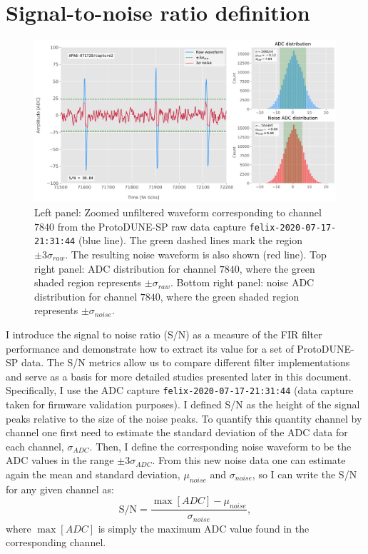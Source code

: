 \section{Signal-to-noise ratio definition}
\label{sec:matched_filter_sn_definition}

\begin{figure}[t]
	\centering
	\includegraphics[width=1\linewidth]{Images/Matched_Filter/waveform_example_raw}
	\caption[Example unfiltered waveform from a ProtoDUNE-SP raw data capture.]{Left panel: Zoomed unfiltered waveform corresponding to channel $7840$ from the ProtoDUNE-SP raw data capture \texttt{felix-2020-07-17-21:31:44} (blue line). The green dashed lines mark the region $\pm3\sigma_{raw}$. The resulting noise waveform is also shown (red line). Top right panel: ADC distribution for channel $7840$, where the green shaded region represents $\pm \sigma_{raw}$. Bottom right panel: noise ADC distribution for channel $7840$, where the green shaded region represents $\pm \sigma_{noise}$.}
	\label{fig:adcs_nofir}
\end{figure}

I introduce the signal to noise ratio (S/N) as a measure of the FIR filter performance and demonstrate how to extract its value for a set of 
ProtoDUNE-SP data. The S/N metrics allow us to compare different filter implementations and serve as a basis for more detailed studies presented later in this document. Specifically, I use the ADC capture \texttt{felix-2020-07-17-21:31:44} (data capture taken for firmware validation purposes). I defined S/N as the height of the signal peaks relative to the size of the noise peaks. To quantify this quantity channel by channel one first need to estimate the standard deviation of the ADC data for each channel, $\sigma_{ADC}$. Then, I define the corresponding noise waveform to be the ADC values in the range $\pm 3 \sigma_{ADC}$. From this new noise data one can estimate again the mean and standard deviation, $\mu_{noise}$ and $\sigma_{noise}$, so I can write the S/N for any given channel as:
\begin{equation}
	\mathrm{S/N} = \frac{\max{[ADC]} - \mu_{noise}}{\sigma_{noise}},
\end{equation}
where $\max{[ADC]}$ is simply the maximum ADC value found in the corresponding channel.

